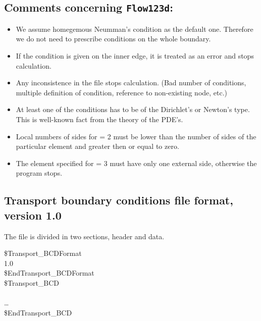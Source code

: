 \subsection*{Comments concerning {\tt Flow123d}:}
\begin{itemize}
  \item We assume homegemous Neumman's condition as the default one. Therefore
    we do not need to prescribe conditions on the whole boundary.
  \item If the condition is given on the inner edge, it is treated as an error
    and stops calculation.
  \item Any inconsistence in the file stops calculation. (Bad number of
    conditions, multiple definition of condition, reference to non-existing
    node, etc.)
  \item At least one of the conditions has to be of the Dirichlet's or
    Newton's type. This is well-known fact from the theory of the PDE's.
  \item Local numbers of sides for  = 2 must be lower than the 
    number of sides of the particular element and greater then or equal to zero.
  \item The element specified for  = 3 must have only one external
    side, otherwise the program stops.
\end{itemize}


\subsection{Transport boundary conditions file format, version 1.0}
\label{transport_boundary_file}

The file is divided in two sections, header and data.
\begin{fileformat}
\$Transport\_BCDFormat\\
1.0  \\
\$EndTransport\_BCDFormat\\
\$Transport\_BCD\\
  \\
      \dots\\
\$EndTransport\_BCD
\end{fileformat}

